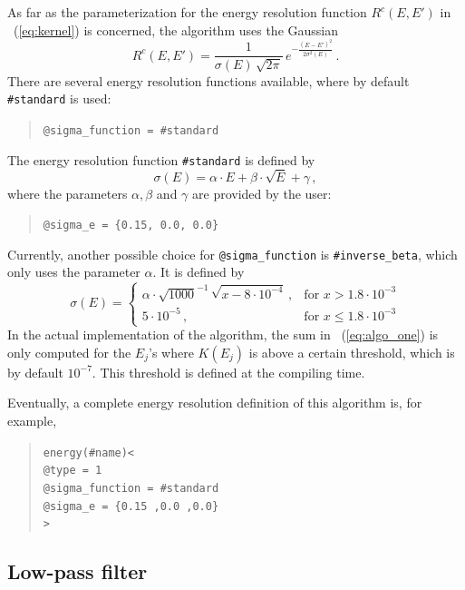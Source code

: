 As far as the parameterization for the energy resolution function 
$R^c(E,E')$ in \eq~(\ref{eq:kernel}) is concerned, the algorithm uses
the Gaussian
\begin{equation}
R^c(E,E')=\frac{1}{\sigma(E)\,\sqrt{2\pi}}\,e^{-\frac{(E-E')^2}{2\sigma^2(E)}} \, .
\end{equation} 
There are several energy resolution functions available, where by default
{\tt \#standard} is used:
\begin{quote}
{\tt \tb @sigma\_function = \#standard} 
\end{quote}
The energy resolution function {\tt \#standard} is defined by
\begin{equation}
\label{eq:sigma_e}
\sigma(E)=\alpha\cdot E + \beta \cdot \sqrt{E} +\gamma\, ,
\end{equation}
where the parameters $\alpha, \beta$ and $\gamma$ are provided by the user:
\begin{quote}
{\tt \tb @sigma\_e = \{0.15, 0.0, 0.0\}}
\end{quote}
Currently, another possible choice for {\tt @sigma\_function} is {\tt \#inverse\_beta},
which only uses the parameter $\alpha$. It is defined by
\begin{equation}
\sigma(E)= \left\{\begin{array}{cl}
 \alpha \cdot \sqrt{1000}^{-1}\,\sqrt{x-8\cdot10^{-4}}\,,&\mathrm{for}\,\, 
x>1.8\cdot10^{-3}\\
5\cdot10^{-5} \,,&\mathrm{for}\,\, x \leq 1.8\cdot10^{-3}
\end{array} \right.
\end{equation}
In the actual implementation of the algorithm,  the sum in \eq~(\ref{eq:algo_one}) is only computed for the $E_j$'s where $K(E_j)$ 
is above a certain threshold, which is by default $10^{-7}$. 
This threshold is defined at the compiling time. 

Eventually,  a complete energy resolution definition of this 
algorithm is, for example,
\begin{quote}
{\tt energy(\#name)<\\
\tb @type = 1\\
\tb @sigma\_function = \#standard\\
\tb @sigma\_e = \{0.15 ,0.0 ,0.0\}\\
>
}
\end{quote}

\subsection{Low-pass filter}

